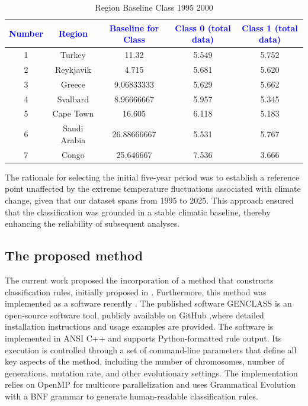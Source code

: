 \documentclass[12pt]{Definitions/academia}
\begin{document}
\begin{table}[H]

\begin{tabular}{|c|c|c|c|c|}
\hline
\textbf{\textcolor{blue}{Number}} & \textbf{\textcolor{blue}{Region}} & \textbf{\textcolor{blue}{Baseline for Class}} & \textbf{\textcolor{blue}{Class 0 (total data)}} & \textbf{\textcolor{blue}{Class 1 (total data)}}\tabularnewline
\hline
\hline
1 & Turkey & 11.32 & 5.549 & 5.752\tabularnewline
\hline
2 & Reykjavik & 4.715 & 5.681 & 5.620\tabularnewline
\hline
3 & Greece & 9.06833333 & 5.629 & 5.662\tabularnewline
\hline
4 & Svalbard & 8.96666667 & 5.957 & 5.345\tabularnewline
\hline
5 & Cape Town & 16.605 & 6.118 & 5.183\tabularnewline
\hline
6 & Saudi Arabia & 26.88666667 & 5.531 & 5.767\tabularnewline
\hline
7 & Congo & 25.646667 & 7.536 & 3.666\tabularnewline
\hline
\end{tabular}

\caption{Region Baseline Class 1995 2000\label{tab:Table-4-Region-Baseline-Class}}

\end{table}

The rationale for selecting the initial five-year period was to establish
a reference point unaffected by the extreme temperature fluctuations
associated with climate change, given that our dataset spans from
1995 to 2025. This approach ensured that the classification was grounded
in a stable climatic baseline, thereby enhancing the reliability of
subsequent analyses.

\subsection{\textmd{The proposed method\label{subsec:The-proposed-method}}}

The current work proposed the incorporation of a method that constructs
classification rules, initially proposed in \textit{\cite{Tsoulos 2020}.}
Furthermore, this method was implemented as a software recently \textit{\cite{Anastasopoulos 2021}.}
The published software GENCLASS is an open\nobreakdash-source software
tool, publicly available on GitHub \cite{GitHub},where detailed installation 
instructions and usage examples are provided.
The software is implemented in ANSI C++ and supports Python\nobreakdash-formatted
rule output. Its execution is controlled through a set of command\nobreakdash-line
parameters that define all key aspects of the method, including the
number of chromosomes, number of generations, mutation rate, and other
evolutionary settings. The implementation relies on OpenMP for multicore
parallelization and uses Grammatical Evolution with a BNF grammar
to generate human\nobreakdash-readable classification rules.
\end{document}
